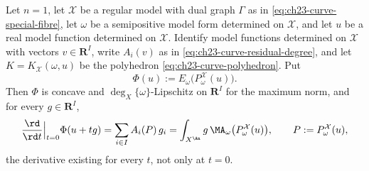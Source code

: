 \begin{proposition}
\label{prop:ch27-curve-shadow}
Let $n=1$, let $\mathcal X$ be a regular model with dual graph
$\Gamma$ as in \eqref{eq:ch23-curve-special-fibre}, let $\omega$ be a
semipositive model form determined on $\mathcal X$, and let $u$ be a
real model function determined on $\mathcal X$.  Identify model functions
determined on $\mathcal X$ with vectors $v\in\mathbf R^I$, write
$A_i(v)$ as in \eqref{eq:ch23-curve-residual-degree}, and let
$K=K_{\mathcal X}(\omega,u)$ be the polyhedron
\eqref{eq:ch23-curve-polyhedron}.  Put
\[
 \Phi(u):=E_\omega\bigl(P^{\mathcal X}_\omega(u)\bigr).
\]
Then $\Phi$ is concave and $\deg_X\{\omega\}$-Lipschitz on
$\mathbf R^I$ for the maximum norm, and for every $g\in\mathbf R^I$,
\begin{equation}\label{eq:ch27-curve-shadow-derivative}
 \frac{\rd}{\rd t}\Big|_{t=0}\Phi(u+tg)
 =\sum_{i\in I}A_i(P)\,g_i
 =\int_{X^{\An}}g\,\MA_\omega\bigl(P^{\mathcal X}_\omega(u)\bigr),
 \qquad P:=P^{\mathcal X}_\omega(u),
\end{equation}
the derivative existing for every $t$, not only at $t=0$.
\end{proposition}

